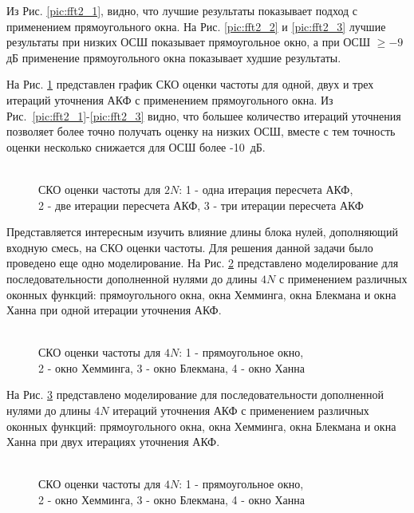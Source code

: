 Из Рис. \ref{pic:fft2_1}, видно, что лучшие результаты показывает подход с применением прямоугольного окна. На Рис. \ref{pic:fft2_2} и \ref{pic:fft2_3} лучшие результаты при низких ОСШ
показывает прямоугольное окно, а при ОСШ ${\ge -9}$ дБ применение прямоугольного окна показывает худшие результаты.

На Рис. \ref{pic:fft2_rect_1_2_3}
представлен график СКО оценки частоты для одной, двух и трех итераций уточнения АКФ с применением прямоугольного окна. Из \mbox{Рис. \ref{pic:fft2_1}-\ref{pic:fft2_3}}  видно, что большее
количество итераций уточнения позволяет более точно получать оценку на низких ОСШ, вместе с тем точность оценки несколько снижается для ОСШ более \mbox{-10 дБ.}
\begin{figure}[h]
	\center{}
	\caption{\\СКО оценки частоты для ${2N}$: 1 - одна итерация пересчета АКФ,\\2 - две итерации пересчета АКФ, 3 - три итерации пересчета АКФ}
	\label{pic:fft2_rect_1_2_3}
\end{figure}

Представляется интересным изучить влияние длины блока нулей, дополняющий входную смесь, на СКО оценки частоты. Для решения данной задачи было проведено еще одно моделирование.
На Рис. \ref{pic:fft4_1} представлено моделирование для последовательности дополненной нулями до длины ${4N}$ с применением различных оконных функций:
прямоугольного окна, окна Хемминга, окна Блекмана и окна Ханна при одной итерации уточнения АКФ.
\begin{figure}[h]
	\center{}
	\caption{\\СКО оценки частоты для ${4N}$: 1 - прямоугольное окно,\\2 - окно Хемминга, 3 - окно Блекмана, 4 - окно Ханна}
	\label{pic:fft4_1}
\end{figure}

На Рис. \ref{pic:fft4_2} представлено моделирование для последовательности дополненной нулями до длины ${4N}$ итераций уточнения АКФ с применением различных оконных функций:
прямоугольного окна, окна Хемминга, окна Блекмана и окна Ханна при двух итерациях уточнения АКФ.
\begin{figure}[h]
	\center{}
	\caption{\\СКО оценки частоты для ${4N}$: 1 - прямоугольное окно,\\2 - окно Хемминга, 3 - окно Блекмана, 4 - окно Ханна}
	\label{pic:fft4_2}
\end{figure}


